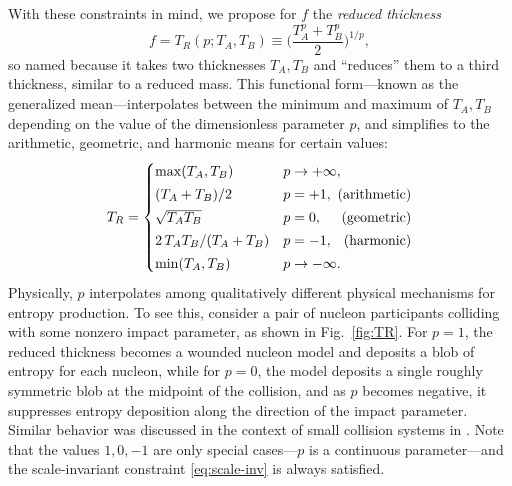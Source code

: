 \documentclass[aps,prc,reprint,amsmath,noeprint]{revtex4-1}
\begin{document}
With these constraints in mind, we propose for $f$ the \emph{reduced thickness}
\begin{equation}
  f = T_R(p; T_A, T_B) \equiv \biggl( \frac{T_A^p + T_B^p}{2} \biggr)^{1/p},
  \label{eq:tr}
\end{equation}
so named because it takes two thicknesses $T_A, T_B$ and ``reduces'' them to a third thickness, similar to a
reduced mass.
This functional form---known as the generalized mean---interpolates between the minimum and maximum of $T_A, T_B$ depending on the value of the dimensionless parameter $p$, and simplifies to the arithmetic, geometric, and harmonic means for certain values:
\begin{equation}
  \newlength{\extraspace}
  \setlength{\extraspace}{0.5ex}
  T_R =
  \begin{cases}
    \max(T_A, T_B) & p \rightarrow +\infty, \\[\extraspace]
    (T_A + T_B)/2 & p = +1, \hfill \text{ (arithmetic)} \\[\extraspace]
    \sqrt{T_A T_B} & p = 0, \hfill \text{ (geometric)} \\[\extraspace]
    2\, T_A T_B/(T_A + T_B) & p = -1, \hfill \text{ (harmonic)} \\[\extraspace]
    \min(T_A, T_B) & p \rightarrow -\infty.
  \end{cases}
\end{equation}
Physically, $p$ interpolates among qualitatively different physical mechanisms for entropy production.
To see this, consider a pair of nucleon participants colliding with some nonzero impact parameter, as shown in Fig.~\ref{fig:TR}.
For $p = 1$, the reduced thickness becomes a wounded nucleon model and deposits a blob of entropy for each nucleon,
while for $p = 0$, the model deposits a single roughly symmetric blob at the midpoint of the collision,
and as $p$ becomes negative, it suppresses entropy deposition along the direction of the impact parameter.
Similar behavior was discussed in the context of small collision systems in \cite{Bzdak:2013zma}.
Note that the values $1, 0, -1$ are only special cases---$p$ is a continuous parameter---and the scale-invariant constraint \eqref{eq:scale-inv} is always satisfied.
\end{document}
